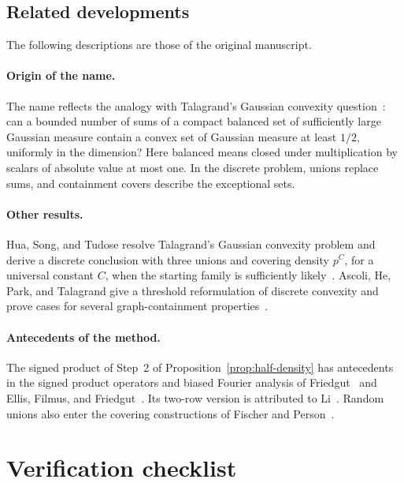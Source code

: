 \documentclass[11pt,letterpaper]{article}
\theoremstyle{definition}
\theoremstyle{remark}
\numberwithin{equation}{section}
\begin{document}
\subsection{Related developments}
\label{sec:related}

The following descriptions are those of the original manuscript.

\paragraph{Origin of the name.}
The name reflects the analogy with Talagrand's Gaussian convexity
question~\cite[Conjecture~2.1]{Talagrand10}: can a bounded number of
sums of a compact balanced set of sufficiently large Gaussian measure
contain a convex set of Gaussian measure at least $1/2$, uniformly in
the dimension? Here balanced means closed under multiplication by
scalars of absolute value at most one. In the discrete problem, unions
replace sums, and containment covers describe the exceptional sets.

\paragraph{Other results.}
Hua, Song, and Tudose resolve Talagrand's Gaussian convexity problem and
derive a discrete conclusion with three unions and covering density
$p^C$, for a universal constant $C$, when the starting family is
sufficiently likely~\cite[Corollaries~1.3--1.4]{HuaSongTudose26}.
Ascoli, He, Park, and Talagrand give a threshold reformulation of discrete
convexity and prove cases for several graph-containment
properties~\cite[Proposition~1.5 and Theorems~1.10--1.13]{AscoliEtAl26}.

\paragraph{Antecedents of the method.}
The signed product of Step~2 of Proposition~\ref{prop:half-density} has
antecedents in the signed product operators and biased Fourier analysis of
Friedgut~\cite[Section~2.2]{Friedgut08} and Ellis, Filmus, and
Friedgut~\cite[Sections~2.2 and~4.1]{EllisFilmusFriedgut12}. Its two-row
version is attributed to Li~\cite[Section~2]{Li26}. Random unions also
enter the covering constructions of Fischer and
Person~\cite[Sections~1.1 and~2]{FischerPerson25}.

\section{Verification checklist}
\label{sec:checklist}
\end{document}
